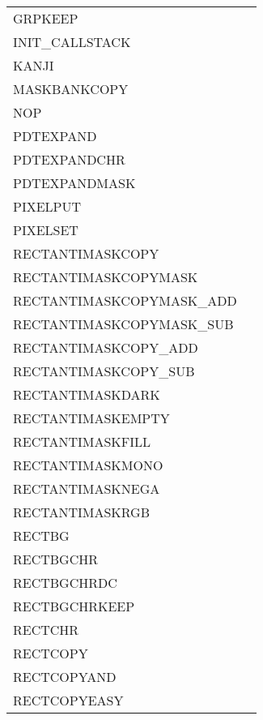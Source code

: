{\begin{supertabular}{l@{\hs}l}
  GRPKEEP                   &\\
  INIT\_CALLSTACK           &        \\
  KANJI                     &            \\
  MASKBANKCOPY              &\\
  NOP                       &              \\
  PDTEXPAND                 &             \\
  PDTEXPANDCHR              &         \\
  PDTEXPANDMASK             &           \\
  PIXELPUT                  &\\
  PIXELSET                  &\\
  RECTANTIMASKCOPY          &        \\
  RECTANTIMASKCOPYMASK      &    \\
  RECTANTIMASKCOPYMASK\_ADD &     \\
  RECTANTIMASKCOPYMASK\_SUB &     \\
  RECTANTIMASKCOPY\_ADD     &         \\
  RECTANTIMASKCOPY\_SUB     &         \\
  RECTANTIMASKDARK          &\\
  RECTANTIMASKEMPTY         &\\
  RECTANTIMASKFILL          &\\
  RECTANTIMASKMONO          &\\
  RECTANTIMASKNEGA          &\\
  RECTANTIMASKRGB           &\\
  RECTBG                    &\\
  RECTBGCHR                 &              \\
  RECTBGCHRDC               &              \\
  RECTBGCHRKEEP             &\\
  RECTCHR                   &\\
  RECTCOPY                  &               \\
  RECTCOPYAND               &                \\
  RECTCOPYEASY              &          \\

\end{supertabular}}
